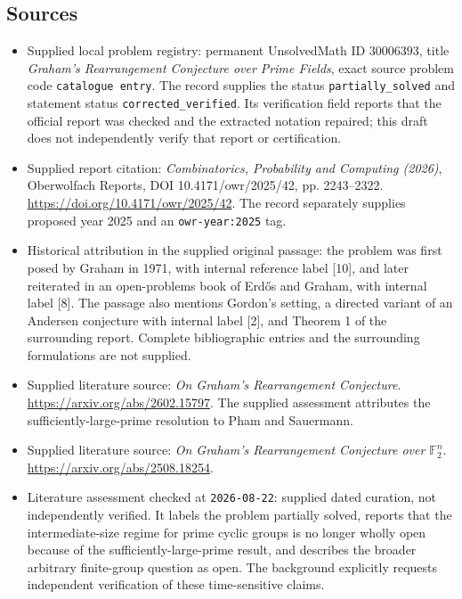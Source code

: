 \documentclass[11pt]{article}
\newcommand{\F}{\mathbb{F}}
\begin{document}
\subsection{Sources}
\begin{itemize}
\item Supplied local problem registry: permanent UnsolvedMath ID \(30006393\), title \emph{Graham's Rearrangement Conjecture over Prime Fields}, exact source problem code \texttt{catalogue entry}. The record supplies the status \texttt{partially\_solved} and statement status \texttt{corrected\_verified}. Its verification field reports that the official report was checked and the extracted notation repaired; this draft does not independently verify that report or certification.
\item Supplied report citation: \emph{Combinatorics, Probability and Computing (2026)}, Oberwolfach Reports, DOI 10.4171/owr/2025/42, pp. 2243--2322. \url{https://doi.org/10.4171/owr/2025/42}. The record separately supplies proposed year 2025 and an \texttt{owr-year:2025} tag.
\item Historical attribution in the supplied original passage: the problem was first posed by Graham in 1971, with internal reference label [10], and later reiterated in an open-problems book of Erd\H{o}s and Graham, with internal label [8]. The passage also mentions Gordon's setting, a directed variant of an Andersen conjecture with internal label [2], and Theorem 1 of the surrounding report. Complete bibliographic entries and the surrounding formulations are not supplied.
\item Supplied literature source: \emph{On Graham's Rearrangement Conjecture}. \url{https://arxiv.org/abs/2602.15797}. The supplied assessment attributes the sufficiently-large-prime resolution to Pham and Sauermann.
\item Supplied literature source: \emph{On Graham's Rearrangement Conjecture over \(\F_2^n\)}. \url{https://arxiv.org/abs/2508.18254}.
\item Literature assessment checked at \texttt{2026-08-22}: supplied dated curation, not independently verified. It labels the problem partially solved, reports that the intermediate-size regime for prime cyclic groups is no longer wholly open because of the sufficiently-large-prime result, and describes the broader arbitrary finite-group question as open. The background explicitly requests independent verification of these time-sensitive claims.
\end{itemize}
\end{document}
